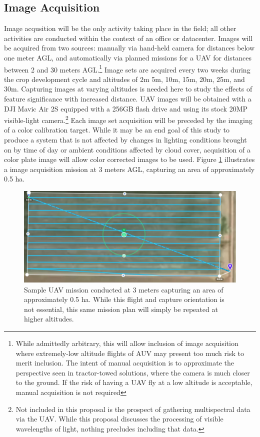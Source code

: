 \documentclass[12pt]{article}
\begin{document}
\subsection{Image Acquisition}
\label{sec:acquisition}
Image acqusition will be the only activity taking place in the field; all other activities are conducted within the context of an office or datacenter. Images will be acquired from two sources: manually via hand-held camera for distances below one meter AGL, and automatically via planned missions for a UAV for distances between 2 and 30 meters AGL.\footnote{While admittedly arbitrary, this will allow inclusion of image acquisition where extremely-low altitude flights of AUV may present too much risk to merit inclusion. The intent of manual acquisition is to approximate the perspective seen in tractor-towed solutions, where the camera is much closer to the ground. If the risk of having a UAV fly at a low altitude is acceptable, manual acquisition is not required} Image sets are acquired every two weeks during the crop development cycle and altitudes of 2m 5m, 10m, 15m, 20m, 25m, and 30m. Capturing images at varying altitudes is needed here to study the effects of feature significance with increased distance.
UAV images will be obtained with a DJI Mavic Air 2S equipped with a 256GB flash drive and using its stock 20MP visible-light camera.\footnote{Not included in this proposal is the prospect of gathering multispectral data via the UAV. While this proposal discusses the processing of visible wavelengths of light, nothing precludes including that data.} Each image set acquisition will be preceded by the imaging of a color calibration target.  While it may be an end goal of this study to produce a system that is not affected by changes in lighting conditions brought on by time of day or ambient conditions affected by cloud cover, acquisition of a color plate image will allow color corrected images to be used. Figure \ref{fig:mission} illustrates a image acquisition mission at 3 meters AGL, capturing an area of approximately 0.5 ha.

\begin{figure}[h!]
	\centering
	\includegraphics[width=0.8\linewidth]{./figures/maricopa-drone-3m.jpg}
	\caption[Semple UAV mission]{Sample UAV mission conducted at 3 meters capturing an area of approximately 0.5 ha. While this flight and capture orientation is not essential, this same mission plan will simply be repeated at higher altitudes.}
	\label{fig:mission}
\end{figure}
\end{document}
